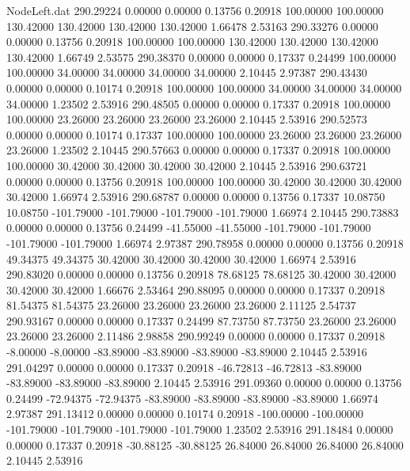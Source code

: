\begin{filecontents}{NodeLeft.dat}
 290.29224    0.00000    0.00000     0.13756    0.20918  100.00000  100.00000  130.42000  130.42000  130.42000  130.42000    1.66478    2.53163
 290.33276    0.00000    0.00000     0.13756    0.20918  100.00000  100.00000  130.42000  130.42000  130.42000  130.42000    1.66749    2.53575
 290.38370    0.00000    0.00000     0.17337    0.24499  100.00000  100.00000   34.00000   34.00000   34.00000   34.00000    2.10445    2.97387
 290.43430    0.00000    0.00000     0.10174    0.20918  100.00000  100.00000   34.00000   34.00000   34.00000   34.00000    1.23502    2.53916
 290.48505    0.00000    0.00000     0.17337    0.20918  100.00000  100.00000   23.26000   23.26000   23.26000   23.26000    2.10445    2.53916
 290.52573    0.00000    0.00000     0.10174    0.17337  100.00000  100.00000   23.26000   23.26000   23.26000   23.26000    1.23502    2.10445
 290.57663    0.00000    0.00000     0.17337    0.20918  100.00000  100.00000   30.42000   30.42000   30.42000   30.42000    2.10445    2.53916
 290.63721    0.00000    0.00000     0.13756    0.20918  100.00000  100.00000   30.42000   30.42000   30.42000   30.42000    1.66974    2.53916
 290.68787    0.00000    0.00000     0.13756    0.17337   10.08750   10.08750 -101.79000 -101.79000 -101.79000 -101.79000    1.66974    2.10445
 290.73883    0.00000    0.00000     0.13756    0.24499  -41.55000  -41.55000 -101.79000 -101.79000 -101.79000 -101.79000    1.66974    2.97387
 290.78958    0.00000    0.00000     0.13756    0.20918   49.34375   49.34375   30.42000   30.42000   30.42000   30.42000    1.66974    2.53916
 290.83020    0.00000    0.00000     0.13756    0.20918   78.68125   78.68125   30.42000   30.42000   30.42000   30.42000    1.66676    2.53464
 290.88095    0.00000    0.00000     0.17337    0.20918   81.54375   81.54375   23.26000   23.26000   23.26000   23.26000    2.11125    2.54737
 290.93167    0.00000    0.00000     0.17337    0.24499   87.73750   87.73750   23.26000   23.26000   23.26000   23.26000    2.11486    2.98858
 290.99249    0.00000    0.00000     0.17337    0.20918   -8.00000   -8.00000  -83.89000  -83.89000  -83.89000  -83.89000    2.10445    2.53916
 291.04297    0.00000    0.00000     0.17337    0.20918  -46.72813  -46.72813  -83.89000  -83.89000  -83.89000  -83.89000    2.10445    2.53916
 291.09360    0.00000    0.00000     0.13756    0.24499  -72.94375  -72.94375  -83.89000  -83.89000  -83.89000  -83.89000    1.66974    2.97387
 291.13412    0.00000    0.00000     0.10174    0.20918 -100.00000 -100.00000 -101.79000 -101.79000 -101.79000 -101.79000    1.23502    2.53916
 291.18484    0.00000    0.00000     0.17337    0.20918  -30.88125  -30.88125   26.84000   26.84000   26.84000   26.84000    2.10445    2.53916

\end{filecontents}
